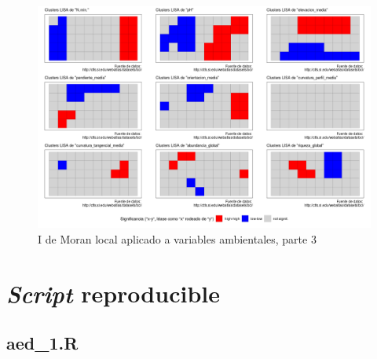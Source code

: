 \documentclass[11pt,]{article}
\begin{document}
\begin{figure}
\centering
\includegraphics{ee_files/yodemoranlocal-3.png}
\caption{I de Moran local aplicado a variables ambientales, parte 3
\label{fig:imoranlocal3}}
\end{figure}

\section{\texorpdfstring{\emph{Script}
reproducible}{Script reproducible}}\label{script-reproducible}

\subsection*{aed\_1.R}\label{aed_1.r}
\end{document}
